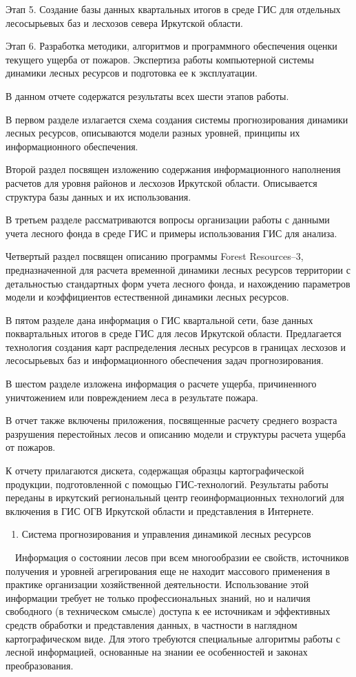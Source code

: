 \documentclass{report}
\begin{document}
Этап 5. Создание базы данных квартальных итогов в среде ГИС для отдельных лесосырьевых баз и лесхозов севера Иркутской
области. 

Этап 6. Разработка методики, алгоритмов и программного обеспечения оценки текущего ущерба от пожаров. Экспертиза работы
компьютерной системы динамики лесных ресурсов и подготовка ее к эксплуатации. 

В данном отчете содержатся результаты всех шести этапов работы. 

В первом разделе излагается схема создания системы прогнозирования динамики лесных ресурсов, описываются модели разных
уровней, принципы их информационного обеспечения. 

Второй раздел посвящен изложению содержания информационного наполнения расчетов для уровня районов и лесхозов Иркутской
области. Описывается структура базы данных и их использования. 

В третьем разделе рассматриваются вопросы организации работы с данными учета лесного фонда в среде ГИС и примеры
использования ГИС для анализа. 

Четвертый раздел посвящен описанию программы Forest Resources–3, предназначенной для расчета временной динамики лесных
ресурсов территории с детальностью стандартных форм учета лесного фонда, и нахождению параметров модели и коэффициентов
естественной динамики лесных ресурсов.

В пятом разделе дана информация о ГИС квартальной сети, базе данных поквартальных итогов в среде ГИС для лесов Иркутской
области. Предлагается технология создания карт распределения лесных ресурсов в границах лесхозов и лесосырьевых баз и
информационного обеспечения задач прогнозирования. 

В шестом разделе изложена информация о расчете ущерба, причиненного уничтожением или повреждением леса в результате
пожара.

В отчет также включены приложения, посвященные расчету среднего возраста разрушения перестойных лесов и описанию модели
и структуры расчета ущерба от пожаров.

К отчету прилагаются дискета, содержащая образцы картографической продукции, подготовленной с помощью ГИС-технологий.
Результаты работы переданы в иркутский региональный центр геоинформационных технологий для включения в ГИС ОГВ
Иркутской области и представления в Интернете. 

\begin{enumerate}
\item Система прогнозирования и управления динамикой лесных ресурсов
\end{enumerate}
\ \ Информация о состоянии лесов при всем многообразии ее свойств, источников получения и уровней агрегирования еще не
находит массового применения в практике организации хозяйственной деятельности. Использование этой информации требует
не только профессиональных знаний, но и наличия свободного (в техническом смысле) доступа к ее источникам и эффективных
средств обработки  и представления данных, в частности в наглядном картографическом виде. Для этого требуются
специальные алгоритмы работы с лесной информацией, основанные на знании ее особенностей и законах преобразования. 
\end{document}
